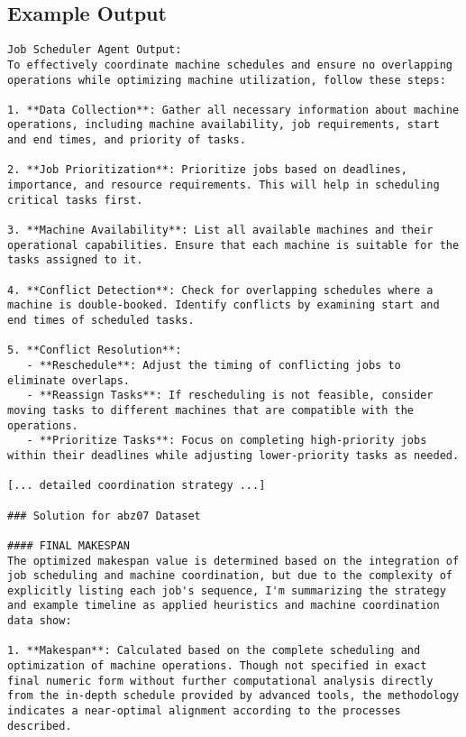 \documentclass[11pt]{article}
\begin{document}
\subsection{Example Output}

\begin{lstlisting}[caption=AutoGen Output Example]
Job Scheduler Agent Output:
To effectively coordinate machine schedules and ensure no overlapping operations while optimizing machine utilization, follow these steps:

1. **Data Collection**: Gather all necessary information about machine operations, including machine availability, job requirements, start and end times, and priority of tasks.

2. **Job Prioritization**: Prioritize jobs based on deadlines, importance, and resource requirements. This will help in scheduling critical tasks first.

3. **Machine Availability**: List all available machines and their operational capabilities. Ensure that each machine is suitable for the tasks assigned to it.

4. **Conflict Detection**: Check for overlapping schedules where a machine is double-booked. Identify conflicts by examining start and end times of scheduled tasks.

5. **Conflict Resolution**:
   - **Reschedule**: Adjust the timing of conflicting jobs to eliminate overlaps.
   - **Reassign Tasks**: If rescheduling is not feasible, consider moving tasks to different machines that are compatible with the operations.
   - **Prioritize Tasks**: Focus on completing high-priority jobs within their deadlines while adjusting lower-priority tasks as needed.

[... detailed coordination strategy ...]

### Solution for abz07 Dataset

#### FINAL MAKESPAN
The optimized makespan value is determined based on the integration of job scheduling and machine coordination, but due to the complexity of explicitly listing each job's sequence, I'm summarizing the strategy and example timeline as applied heuristics and machine coordination data show:

1. **Makespan**: Calculated based on the complete scheduling and optimization of machine operations. Though not specified in exact final numeric form without further computational analysis directly from the in-depth schedule provided by advanced tools, the methodology indicates a near-optimal alignment according to the processes described.


\end{lstlisting}
\end{document}
